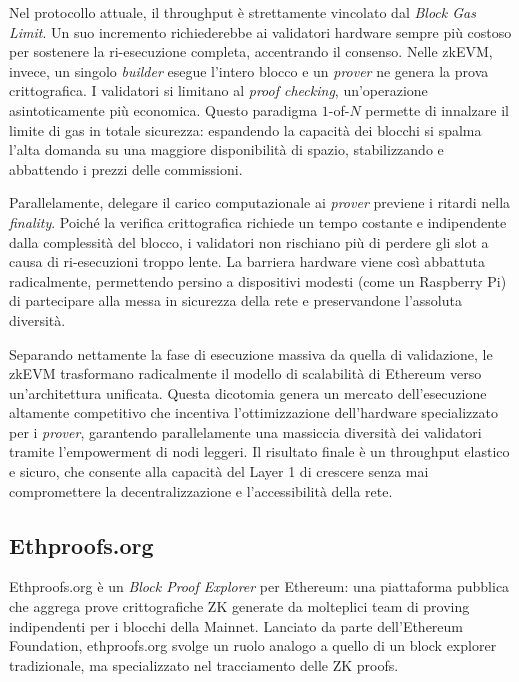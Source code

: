 \documentclass[12pt,a4paper,openright,twoside]{report}
\begin{document}
Nel protocollo attuale, il throughput è strettamente vincolato dal \textit{Block Gas Limit}. Un suo incremento richiederebbe ai validatori hardware sempre più costoso per sostenere la ri-esecuzione completa, accentrando il consenso. Nelle zkEVM, invece, un singolo \textit{builder} esegue l'intero blocco e un \textit{prover} ne genera la prova crittografica. I validatori si limitano al \textit{proof checking}, un'operazione asintoticamente più economica. Questo paradigma $1$-of-$N$ permette di innalzare il limite di gas in totale sicurezza: espandendo la capacità dei blocchi si spalma l'alta domanda su una maggiore disponibilità di spazio, stabilizzando e abbattendo i prezzi delle commissioni.

Parallelamente, delegare il carico computazionale ai \textit{prover} previene i ritardi nella \textit{finality}. Poiché la verifica crittografica richiede un tempo costante e indipendente dalla complessità del blocco, i validatori non rischiano più di perdere gli slot a causa di ri-esecuzioni troppo lente. La barriera hardware viene così abbattuta radicalmente, permettendo persino a dispositivi modesti (come un Raspberry Pi) di partecipare alla messa in sicurezza della rete e preservandone l'assoluta diversità.

Separando nettamente la fase di esecuzione massiva da quella di validazione, le zkEVM trasformano radicalmente il modello di scalabilità di Ethereum verso un'architettura unificata. Questa dicotomia genera un mercato dell'esecuzione altamente competitivo che incentiva l'ottimizzazione dell'hardware specializzato per i \textit{prover}, garantendo parallelamente una massiccia diversità dei validatori tramite l'empowerment di nodi leggeri. Il risultato finale è un throughput elastico e sicuro, che consente alla capacità del Layer 1 di crescere senza mai compromettere la decentralizzazione e l'accessibilità della rete.

\subsection{Ethproofs.org}

Ethproofs.org\cite{ethproofs} è un \textit{Block Proof Explorer} per Ethereum: una piattaforma pubblica che aggrega prove crittografiche ZK generate da molteplici team di proving indipendenti per i blocchi della Mainnet. Lanciato da parte dell'Ethereum Foundation, ethproofs.org svolge un ruolo analogo a quello di un block explorer tradizionale, ma specializzato nel tracciamento delle ZK proofs.
\end{document}
